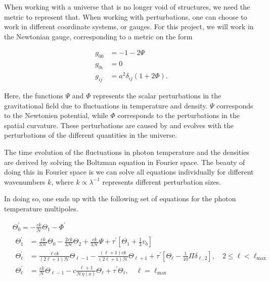 \documentclass[12pt]{article}
\begin{document}
When working with a universe that is no longer void of structures, we need the metric to represent that. When working with perturbations, one can choose to work in different coordinate systems, or gauges. For this project, we will work in the Newtonian gauge, corresponding to a metric on the form

\begin{align}\label{eq:perturbed metric}
    g_{00} &= -1-2\Psi \nonumber \\
    g_{0i} &= 0 \\
    g_{ij} &= a^2\delta_{ij} (1+2\Phi) \nonumber.
\end{align}

Here, the functions $\Psi$ and $\Phi$ represents the scalar perturbations in the gravitational field due to fluctuations in temperature and density. $\Psi$ corresponds to the Newtonien potential, while $\Phi$ corresponds to the perturbations in the spatial curvature. These perturbations are caused by and evolves with the perturbations of the different quantities in the universe. 

The time evolution of the fluctuations in photon temperature and the densities are derived by solving the Boltzman equation in Fourier space. The beauty of doing this in Fourier space is we can solve all equations individually for different wavenumbers $k$, where $k\propto\lambda^{-1}$ represents different perturbation sizes. 


In doing so, one ends up with the following set of equations for the photon temperature multipoles.


\begin{equation}\begin{aligned}\label{eq: photon multipoles dx}
    &\Theta_{0}^{\prime}=-\frac{c k}{\mathcal{H}} \Theta_{1}-\Phi^{\prime}\\
    &\begin{aligned}
    \Theta_{1}^{\prime} &=\frac{c k}{3 \mathcal{H}} \Theta_{0}-\frac{2 c k}{3 \mathcal{H}} \Theta_{2}+\frac{c k}{3 \mathcal{H}} \Psi+\tau^{\prime}\left[\Theta_{1}+\frac{1}{3} v_{b}\right] \\
    \Theta_{\ell}^{\prime} &=\frac{\ell c k}{(2 \ell+1) \mathcal{H}} \Theta_{\ell-1}-\frac{(\ell+1) c k}{(2 \ell+1) \mathcal{H}} \Theta_{\ell+1}+\tau^{\prime}\left[\Theta_{\ell}-\frac{1}{10} \Pi \delta_{\ell, 2}\right], \quad 2 \leq \ell<\ell_{\max } \\
    \Theta_{\ell}^{\prime} &=\frac{c k}{\mathcal{H}} \Theta_{\ell-1}-c \frac{\ell+1}{\mathcal{H} \eta(x)} \Theta_{\ell}+\tau^{\prime} \Theta_{\ell}, \quad \ell=\ell_{\max }
    \end{aligned}
    \end{aligned}\end{equation}
\end{document}
